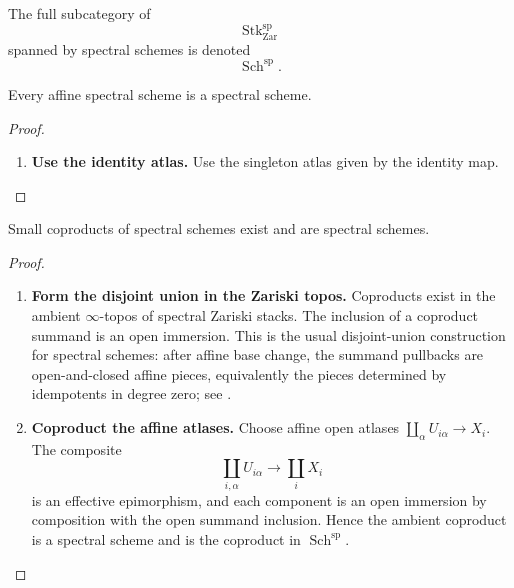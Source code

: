 The full subcategory of
\[
    \operatorname{Stk}^{\mathrm{sp}}_{\mathrm{Zar}}
\]
spanned by spectral schemes is denoted
\[
    \operatorname{Sch}^{\mathrm{sp}}.
\]

\begin{proposition}
\label{prop:affines-are-spectral-schemes}
Every affine spectral scheme is a spectral scheme.
\end{proposition}

\begin{proof}
\leavevmode
\begin{enumerate}[label=\textup{(\arabic*)}]
    \item \textbf{Use the identity atlas.}
    Use the singleton atlas given by the identity map.
\end{enumerate}
\end{proof}

\begin{proposition}
\label{prop:spectral-schemes-coproducts}
Small coproducts of spectral schemes exist and are spectral schemes.
\end{proposition}

\begin{proof}
\leavevmode
\begin{enumerate}[label=\textup{(\arabic*)}]
    \item \textbf{Form the disjoint union in the Zariski topos.}
    Coproducts exist in the ambient \(\infty\)-topos of spectral Zariski
    stacks. The inclusion of a coproduct summand is an open immersion. This is
    the usual disjoint-union construction for spectral schemes: after affine
    base change, the summand pullbacks are open-and-closed affine pieces,
    equivalently the pieces determined by idempotents in degree zero; see
    \cite{LurieSAG}.

    \item \textbf{Coproduct the affine atlases.}
    Choose affine open atlases \(\coprod_\alpha U_{i\alpha}\to X_i\).
    The composite
    \[
        \coprod_{i,\alpha}U_{i\alpha}
        \longrightarrow
        \coprod_iX_i
    \]
    is an effective epimorphism, and each component is an open immersion by
    composition with the open summand inclusion. Hence the ambient coproduct
    is a spectral scheme and is the coproduct in
    \(\operatorname{Sch}^{\mathrm{sp}}\).
\end{enumerate}
\end{proof}

